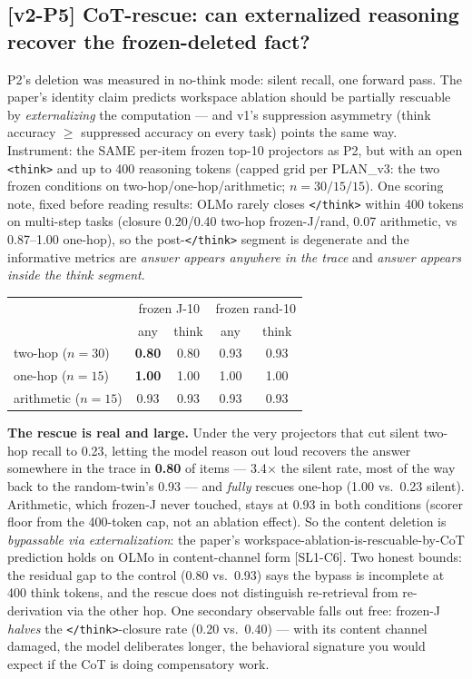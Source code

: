 \documentclass[10pt]{article}
\newcommand{\code}[1]{\texttt{#1}}
\begin{document}
\subsection{[v2-P5] CoT-rescue: can externalized reasoning recover the
frozen-deleted fact?}

P2's deletion was measured in no-think mode: silent recall, one forward
pass. The paper's identity claim predicts workspace ablation should be
partially rescuable by \emph{externalizing} the computation --- and v1's
suppression asymmetry (think accuracy $\ge$ suppressed accuracy on every
task) points the same way. Instrument: the SAME per-item frozen top-10
projectors as P2, but with an open \code{<think>} and up to 400 reasoning
tokens (capped grid per PLAN\_v3: the two frozen conditions on
two-hop/one-hop/arithmetic; $n{=}30/15/15$). One scoring note, fixed
before reading results: OLMo rarely closes \code{</think>} within 400
tokens on multi-step tasks (closure 0.20/0.40 two-hop frozen-J/rand, 0.07
arithmetic, vs 0.87--1.00 one-hop), so the post-\code{</think>} segment is
degenerate and the informative metrics are \emph{answer appears anywhere
in the trace} and \emph{answer appears inside the think segment}.

\begin{center}\small
\begin{tabular}{lcccc}
\toprule
 & \multicolumn{2}{c}{frozen J-10} & \multicolumn{2}{c}{frozen rand-10} \\
 & any & think & any & think \\
\midrule
two-hop ($n{=}30$)    & \textbf{0.80} & 0.80 & 0.93 & 0.93 \\
one-hop ($n{=}15$)    & \textbf{1.00} & 1.00 & 1.00 & 1.00 \\
arithmetic ($n{=}15$) & 0.93 & 0.93 & 0.93 & 0.93 \\
\bottomrule
\end{tabular}
\end{center}

\textbf{The rescue is real and large.} Under the very projectors that cut
silent two-hop recall to 0.23, letting the model reason out loud recovers
the answer somewhere in the trace in \textbf{0.80} of items --- 3.4$\times$
the silent rate, most of the way back to the random-twin's 0.93 --- and
\emph{fully} rescues one-hop (1.00 vs.\ 0.23 silent). Arithmetic, which
frozen-J never touched, stays at 0.93 in both conditions (scorer floor
from the 400-token cap, not an ablation effect). So the content deletion
is \emph{bypassable via externalization}: the paper's
workspace-ablation-is-rescuable-by-CoT prediction holds on OLMo in
content-channel form [SL1-C6]. Two honest bounds: the residual gap to the
control (0.80 vs.\ 0.93) says the bypass is incomplete at 400 think
tokens, and the rescue does not distinguish re-retrieval from
re-derivation via the other hop. One secondary observable falls out free:
frozen-J \emph{halves} the \code{</think>}-closure rate (0.20 vs.\ 0.40)
--- with its content channel damaged, the model deliberates longer, the
behavioral signature you would expect if the CoT is doing compensatory
work.
\end{document}

